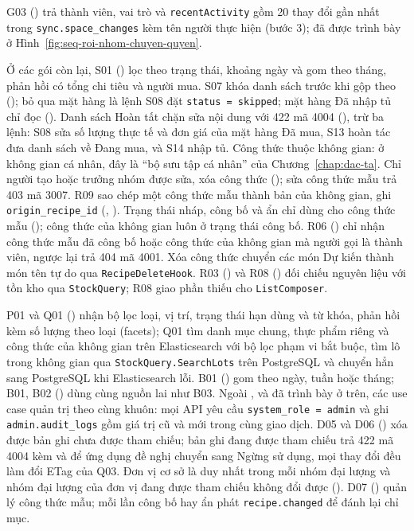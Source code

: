 G03 () trả thành viên, vai trò và \texttt{recentActivity} gồm 20 thay đổi gần nhất trong \texttt{sync.space\_changes} kèm tên người thực hiện (bước 3);  đã được trình bày ở Hình~\ref{fig:seq-roi-nhom-chuyen-quyen}.

Ở các gói còn lại, S01 () lọc theo trạng thái, khoảng ngày và gom theo tháng, phản hồi có tổng chi tiêu và người mua. S07 khóa danh sách trước khi gộp theo  (); bỏ qua mặt hàng là lệnh S08 đặt \texttt{status = skipped}; mặt hàng Đã nhập tủ chỉ đọc (). Danh sách Hoàn tất chặn sửa nội dung với 422 mã 4004 (), trừ ba lệnh: S08 sửa số lượng thực tế và đơn giá của mặt hàng Đã mua, S13 hoàn tác đưa danh sách về Đang mua, và S14 nhập tủ. Công thức thuộc không gian: ở không gian cá nhân, đây là “bộ sưu tập cá nhân” của Chương~\ref{chap:dac-ta}. Chỉ người tạo hoặc trưởng nhóm được sửa, xóa công thức (); sửa công thức mẫu trả 403 mã 3007. R09 sao chép một công thức mẫu thành bản của không gian, ghi \texttt{origin\_recipe\_id} (, ). Trạng thái nháp, công bố và ẩn chỉ dùng cho công thức mẫu (); công thức của không gian luôn ở trạng thái công bố. R06 () chỉ nhận công thức mẫu đã công bố hoặc công thức của không gian mà người gọi là thành viên, ngược lại trả 404 mã 4001. Xóa công thức chuyển các món Dự kiến thành món tên tự do qua \texttt{RecipeDeleteHook}. R03 () và R08 () đối chiếu nguyên liệu với tồn kho qua \texttt{StockQuery}; R08 giao phần thiếu cho \texttt{ListComposer}.

P01 và Q01 () nhận bộ lọc loại, vị trí, trạng thái hạn dùng và từ khóa, phản hồi kèm số lượng theo loại (facets); Q01 tìm danh mục chung, thực phẩm riêng và công thức của không gian trên Elasticsearch với bộ lọc phạm vi bắt buộc, tìm lô trong không gian qua \texttt{StockQuery.SearchLots} trên PostgreSQL và chuyển hẳn sang PostgreSQL khi Elasticsearch lỗi. B01 () gom theo ngày, tuần hoặc tháng; B01, B02 () dùng cùng nguồn lai như B03. Ngoài ,  và  đã trình bày ở trên, các use case quản trị theo cùng khuôn: mọi API yêu cầu \texttt{system\_role = admin} và ghi \texttt{admin.audit\_logs} gồm giá trị cũ và mới trong cùng giao dịch. D05 và D06 () xóa được bản ghi chưa được tham chiếu; bản ghi đang được tham chiếu trả 422 mã 4004 kèm  và  để ứng dụng đề nghị chuyển sang Ngừng sử dụng, mọi thay đổi đều làm đổi ETag của Q03. Đơn vị cơ sở là duy nhất trong mỗi nhóm đại lượng và nhóm đại lượng của đơn vị đang được tham chiếu không đổi được (). D07 () quản lý công thức mẫu; mỗi lần công bố hay ẩn phát \texttt{recipe.changed} để đánh lại chỉ mục.
